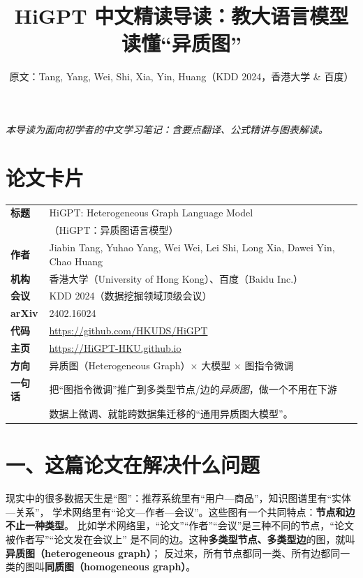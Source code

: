 \documentclass[11pt,UTF8,fontset=fandol]{ctexart}
\title{HiGPT 中文精读导读：教大语言模型读懂“异质图”}
\author{原文：Tang, Yang, Wei, Shi, Xia, Yin, Huang（KDD 2024，香港大学 \& 百度）}
\date{}
\begin{document}
\maketitle
\begin{center}\small\textit{本导读为面向初学者的中文学习笔记：含要点翻译、公式精讲与图表解读。}\end{center}

\section*{论文卡片}
\begin{center}
\begin{tabular}{@{}ll@{}}
\toprule
\textbf{标题} & HiGPT: Heterogeneous Graph Language Model \\
            & （HiGPT：异质图语言模型） \\
\textbf{作者} & Jiabin Tang, Yuhao Yang, Wei Wei, Lei Shi, Long Xia, Dawei Yin, Chao Huang \\
\textbf{机构} & 香港大学（University of Hong Kong）、百度（Baidu Inc.） \\
\textbf{会议} & KDD 2024（数据挖掘领域顶级会议） \\
\textbf{arXiv} & 2402.16024 \\
\textbf{代码} & \url{https://github.com/HKUDS/HiGPT} \\
\textbf{主页} & \url{https://HiGPT-HKU.github.io} \\
\textbf{方向} & 异质图（Heterogeneous Graph）$\times$ 大模型 $\times$ 图指令微调 \\
\textbf{一句话} & 把“图指令微调”推广到多类型节点/边的\emph{异质图}，做一个不用在下游 \\
              & 数据上微调、就能跨数据集迁移的“通用异质图大模型”。 \\
\bottomrule
\end{tabular}
\end{center}

\section{一、这篇论文在解决什么问题}

现实中的很多数据天生是“图”：推荐系统里有“用户—商品”，知识图谱里有“实体—关系”，
学术网络里有“论文—作者—会议”。这些图有一个共同特点：\textbf{节点和边不止一种类型}。
比如学术网络里，“论文”“作者”“会议”是三种不同的节点，“论文被作者写”“论文发在会议上”
是不同的边。这种\textbf{多类型节点、多类型边}的图，就叫\textbf{异质图（heterogeneous graph）}；
反过来，所有节点都同一类、所有边都同一类的图叫\textbf{同质图（homogeneous graph）}。
\end{document}
